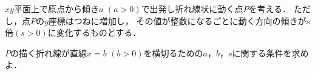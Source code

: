 \documentclass[../../main.tex]{subfiles}
\begin{document}
$xy$平面上で原点から傾き$a$ $(a>0)$で出発し折れ線状に動く点$P$を考える．
ただし，点$P$の$y$座標はつねに増加し，
その値が整数になるごとに動く方向の傾きが$s$倍$(s>0)$に変化するものとする．

$P$の描く折れ線が直線$x=b$ $(b>0)$を横切るための$a$，$b$，$s$に関する条件を求めよ．
\end{document}
